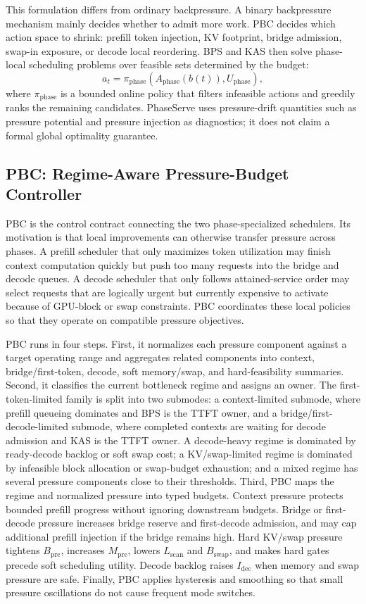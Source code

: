 \documentclass[lettersize,journal]{IEEEtran}
\begin{document}
This formulation differs from ordinary backpressure. A binary backpressure mechanism mainly decides whether to admit more work. PBC decides which action space to shrink: prefill token injection, KV footprint, bridge admission, swap-in exposure, or decode local reordering. BPS and KAS then solve phase-local scheduling problems over feasible sets determined by the budget:
\begin{equation}
a_t=\pi_{\mathrm{phase}}(A_{\mathrm{phase}}(b(t)), U_{\mathrm{phase}}),
\end{equation}
where $\pi_{\mathrm{phase}}$ is a bounded online policy that filters infeasible actions and greedily ranks the remaining candidates. PhaseServe uses pressure-drift quantities such as pressure potential and pressure injection as diagnostics; it does not claim a formal global optimality guarantee.

\subsection{PBC: Regime-Aware Pressure-Budget Controller}

PBC is the control contract connecting the two phase-specialized schedulers. Its motivation is that local improvements can otherwise transfer pressure across phases. A prefill scheduler that only maximizes token utilization may finish context computation quickly but push too many requests into the bridge and decode queues. A decode scheduler that only follows attained-service order may select requests that are logically urgent but currently expensive to activate because of GPU-block or swap constraints. PBC coordinates these local policies so that they operate on compatible pressure objectives.

PBC runs in four steps. First, it normalizes each pressure component against a target operating range and aggregates related components into context, bridge/first-token, decode, soft memory/swap, and hard-feasibility summaries. Second, it classifies the current bottleneck regime and assigns an owner. The first-token-limited family is split into two submodes: a context-limited submode, where prefill queueing dominates and BPS is the TTFT owner, and a bridge/first-decode-limited submode, where completed contexts are waiting for decode admission and KAS is the TTFT owner. A decode-heavy regime is dominated by ready-decode backlog or soft swap cost; a KV/swap-limited regime is dominated by infeasible block allocation or swap-budget exhaustion; and a mixed regime has several pressure components close to their thresholds. Third, PBC maps the regime and normalized pressure into typed budgets. Context pressure protects bounded prefill progress without ignoring downstream budgets. Bridge or first-decode pressure increases bridge reserve and first-decode admission, and may cap additional prefill injection if the bridge remains high. Hard KV/swap pressure tightens $B_{\mathrm{pre}}$, increases $M_{\mathrm{pre}}$, lowers $L_{\mathrm{scan}}$ and $B_{\mathrm{swap}}$, and makes hard gates precede soft scheduling utility. Decode backlog raises $I_{\mathrm{dec}}$ when memory and swap pressure are safe. Finally, PBC applies hysteresis and smoothing so that small pressure oscillations do not cause frequent mode switches.
\end{document}
